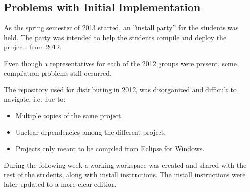 \subsection*{Problems with Initial Implementation}
As the spring semester of 2013 started, an ''install party'' for the students was held. The party was intended to help the students compile and deploy the projects from 2012.

Even though a representatives for each of the 2012 groups were present, some compilation problems still occurred.

The repository used for distributing in 2012, was disorganized and difficult to navigate, i.e. due to:
\begin{itemize}
  \item Multiple copies of the same project.
  \item Unclear dependencies among the different project.
  \item Projects only meant to be compiled from Eclipse for Windows.
\end{itemize}

During the following week a working workspace was created and shared with the rest of the students, along with install instructions. The install instructions were later updated to a more clear edition.
